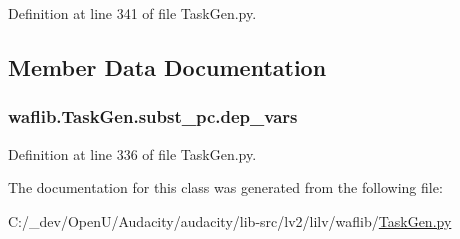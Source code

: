 Definition at line 341 of file Task\+Gen.\+py.



\subsection{Member Data Documentation}
\subsubsection[{\texorpdfstring{dep\+\_\+vars}{dep_vars}}]{\setlength{\rightskip}{0pt plus 5cm}waflib.\+Task\+Gen.\+subst\+\_\+pc.\+dep\+\_\+vars}\hypertarget{classwaflib_1_1_task_gen_1_1subst__pc_a3c03b7bf2525e0ed0a0ada6c3b919a07}{}\label{classwaflib_1_1_task_gen_1_1subst__pc_a3c03b7bf2525e0ed0a0ada6c3b919a07}


Definition at line 336 of file Task\+Gen.\+py.



The documentation for this class was generated from the following file\+:\begin{DoxyCompactItemize}
\item 
C\+:/\+\_\+dev/\+Open\+U/\+Audacity/audacity/lib-\/src/lv2/lilv/waflib/\hyperlink{lilv_2waflib_2_task_gen_8py}{Task\+Gen.\+py}\end{DoxyCompactItemize}
